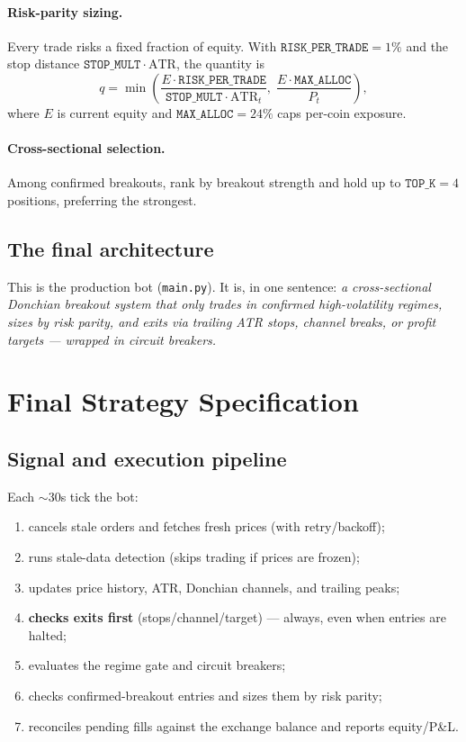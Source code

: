 \documentclass[11pt,a4paper]{article}
\newcommand{\param}[1]{\texttt{#1}}
\newcommand{\code}[1]{\texttt{#1}}
\begin{document}
\paragraph{Risk-parity sizing.} Every trade risks a fixed fraction of equity. With
$\param{RISK\_PER\_TRADE}=1\%$ and the stop distance $\param{STOP\_MULT}\cdot
\mathrm{ATR}$, the quantity is
\begin{equation}
  q = \min\!\left(
        \frac{E \cdot \param{RISK\_PER\_TRADE}}{\param{STOP\_MULT}\cdot \mathrm{ATR}_t},\;
        \frac{E \cdot \param{MAX\_ALLOC}}{P_t}
      \right),
\end{equation}
where $E$ is current equity and $\param{MAX\_ALLOC}=24\%$ caps per-coin exposure.
\paragraph{Cross-sectional selection.} Among confirmed breakouts, rank by breakout
strength and hold up to $\param{TOP\_K}=4$ positions, preferring the strongest.

\subsection{The final architecture}
This is the production bot (\code{main.py}). It is, in one sentence:
\emph{a cross-sectional Donchian breakout system that only trades in confirmed
high-volatility regimes, sizes by risk parity, and exits via trailing ATR stops,
channel breaks, or profit targets --- wrapped in circuit breakers.}

\section{Final Strategy Specification}

\subsection{Signal and execution pipeline}
Each $\sim$30s tick the bot:
\begin{enumerate}[noitemsep]
  \item cancels stale orders and fetches fresh prices (with retry/backoff);
  \item runs stale-data detection (skips trading if prices are frozen);
  \item updates price history, ATR, Donchian channels, and trailing peaks;
  \item \textbf{checks exits first} (stops/channel/target) --- always, even when entries are halted;
  \item evaluates the regime gate and circuit breakers;
  \item checks confirmed-breakout entries and sizes them by risk parity;
  \item reconciles pending fills against the exchange balance and reports equity/P\&L.
\end{enumerate}
\end{document}
